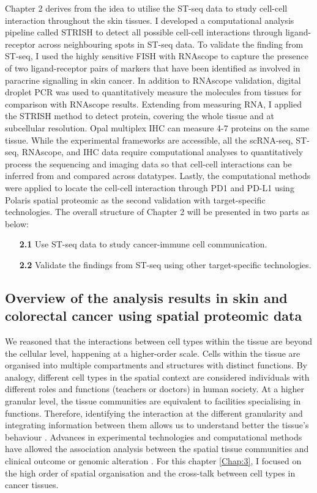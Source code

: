 Chapter 2 derives from the idea to utilise the ST-seq data to study cell-cell interaction throughout the skin tissues. I developed a computational analysis pipeline called STRISH to detect all possible cell-cell interactions through ligand-receptor across neighbouring spots in ST-seq data. To validate the finding from ST-seq, I used the highly sensitive FISH with RNAscope to capture the presence of two ligand-receptor pairs of markers that have been identified as involved in paracrine signalling in skin cancer. In addition to RNAscope validation, digital droplet PCR was used to quantitatively measure the molecules from tissues for comparison with RNAscope results. Extending from measuring RNA, I applied the STRISH method to detect protein, covering the whole tissue and at subcellular resolution. Opal multiplex IHC can measure 4-7 proteins on the same tissue. While the experimental frameworks are accessible, all the scRNA-seq, ST-seq, RNAscope, and IHC data require computational analyses to quantitatively process the sequencing and imaging data so that cell-cell interactions can be inferred from and compared across datatypes. Lastly, the computational methods were applied to locate the cell-cell interaction through PD1 and PD-L1 using Polaris spatial proteomic as the second validation with target-specific technologies. The overall structure of Chapter 2 will be presented in two parts as below:     
\begin{enumerate}[align=left]
    \item[\textbf{2.1}] Use ST-seq data to study cancer-immune cell communication.
    \item[\textbf{2.2}] Validate the findings from ST-seq using other target-specific technologies.
\end{enumerate}

\subsection{Overview of the analysis results in skin and colorectal cancer using spatial proteomic data}
We reasoned that the interactions between cell types within the tissue are beyond the cellular level, happening at a higher-order scale. Cells within the tissue are organised into multiple compartments and structures with distinct functions. By analogy, different cell types in the spatial context are considered individuals with different roles and functions (\ie teachers or doctors) in human society. At a higher granular level, the tissue communities are equivalent to facilities specialising in functions. Therefore, identifying the interaction at the different granularity and integrating information between them allows us to understand better the tissue's behaviour \cite{schurch2020coordinated}. Advances in experimental technologies and computational methods have allowed the association analysis between the spatial tissue communities and clinical outcome or genomic alteration \cite{schurch2020coordinated, danenberg2022breast}. For this chapter \ref{Chap:3}, I focused on the high order of spatial organisation and the cross-talk between cell types in cancer tissues.

